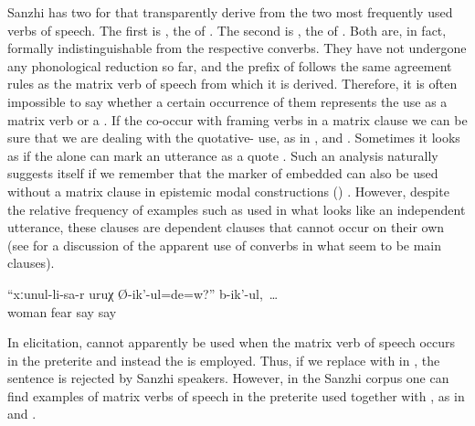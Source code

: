 Sanzhi has two   for  that transparently derive from the two most frequently used verbs of speech. The first is , the  of . The second is , the  of . Both are, in fact, formally indistinguishable from the respective converbs. They have not undergone any phonological reduction so far, and the  prefix of  follows the same agreement rules as the matrix verb of speech from which it is derived. Therefore, it is often impossible to say whether a certain occurrence of them represents the use as a matrix verb or a  . If the   co-occur with framing verbs in a matrix clause we can be sure that we are dealing with the quotative- use, as in ,  and . Sometimes it looks as if the   alone can mark an utterance as a quote . Such an analysis naturally suggests itself if we remember that the marker of embedded  can also be used without a matrix clause in epistemic modal constructions () \citep{ForkerLTSanzhi}. However, despite the relative frequency of examples such as  used in what looks like an independent utterance, these clauses are dependent clauses that cannot occur on their own (see  for a discussion of the apparent use of converbs in what seem to be main clauses).
%
\begin{exe}
	\ex	\label{ex:Are you afraid of your wife?, they say and}
	\gll	``xːunul-li-sa-r	uruχ	Ø-ik'-ul=de=w?''	b-ik'-ul,~\ldots\\
		woman	fear	say	say\\
	\glt	{}
\end{exe}

In elicitation,  cannot apparently be used when the matrix verb of speech occurs in the preterite and instead the   is employed. Thus, if we replace  with  in , the sentence is rejected by Sanzhi speakers. However, in the Sanzhi corpus one can find examples of matrix verbs of speech in the preterite used together with , as in  and .

